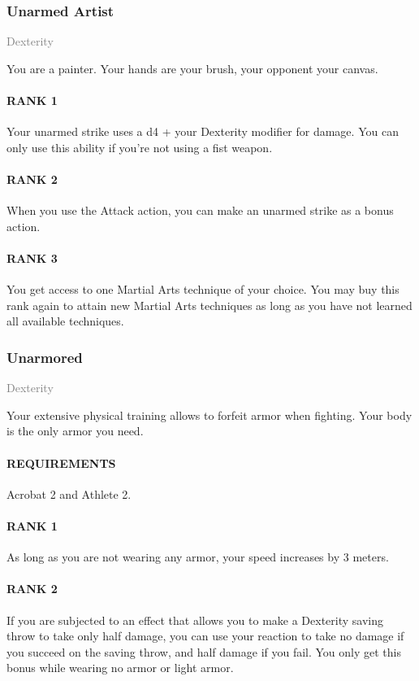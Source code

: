 \subsubsection{Unarmed Artist} \label{feat::unarmedartist}
\small{\textcolor{gray}{Dexterity}}

\normalsize
You are a painter.
Your hands are your brush, your opponent your canvas.
\paragraph{RANK 1} Your unarmed strike uses a d4 + your Dexterity modifier for damage.
You can only use this ability if you're not using a fist weapon.
\paragraph{RANK 2} When you use the Attack action, you can make an unarmed strike as a bonus action.
\paragraph{RANK 3} You get access to one Martial Arts technique of your choice.
You may buy this rank again to attain new Martial Arts techniques as long as you have not learned all available techniques.

\subsubsection{Unarmored} \label{feat::unarmored}
\small{\textcolor{gray}{Dexterity}}

\normalsize
Your extensive physical training allows to forfeit armor when fighting.
Your body is the only armor you need.
\paragraph{REQUIREMENTS} Acrobat 2 and Athlete 2.
\paragraph{RANK 1} As long as you are not wearing any armor, your speed increases by 3 meters.
\paragraph{RANK 2} If you are subjected to an effect that allows you to make a Dexterity saving throw to take only half damage, you can use your reaction to take no damage if you succeed on the saving throw, and half damage if you fail.
You only get this bonus while wearing no armor or light armor.
